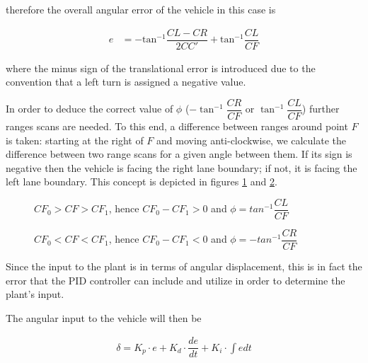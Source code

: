 therefore the overall angular error of the vehicle in this case is

\begin{align}
  e &= -\text{tan}^{-1}\dfrac{CL-CR}{2CC'} + \text{tan}^{-1}\dfrac{CL}{CF}
\end{align}

where the minus sign of the translational error is introduced due to the
convention that a left turn is assigned a negative value.


In order to deduce the correct value of $\phi$ ($-\tan^{-1}\dfrac{CR}{CF}$ or
$\tan^{-1}\dfrac{CL}{CF}$) further ranges scans are needed. To this end,
a difference between ranges around point $F$ is taken: starting at the
right of $F$ and moving anti-clockwise, we calculate the difference between
two range scans for a given angle between them. If its sign
is negative then the vehicle is facing the right lane boundary; if not,
it is facing the left lane boundary. This concept is depicted in figures
\ref{fig:range_diff_positive} and  \ref{fig:range_diff_negative}.

\begin{figure}[H]\centering
  \scalebox{1}{}
  \caption{$CF_0 > CF > CF_1$, hence $CF_0 - CF_1 > 0$ and $\phi = tan^{-1} \dfrac{CL}{CF}$}
  \label{fig:range_diff_positive}
\end{figure}

\begin{figure}[H]\centering
  \scalebox{1}{}
  \caption{$CF_0 < CF < CF_1$, hence $CF_0 - CF_1 < 0$ and $\phi = -tan^{-1} \dfrac{CR}{CF}$}
  \label{fig:range_diff_negative}
\end{figure}


Since the input to the plant is in terms of angular displacement, this
is in fact the error that the PID controller can include and utilize in
order to determine the plant's input.

The angular input to the vehicle will then be

\begin{align}
  \delta = K_p \cdot e + K_d \cdot \dfrac{de}{dt} + K_i \cdot \int e dt
\end{align}





